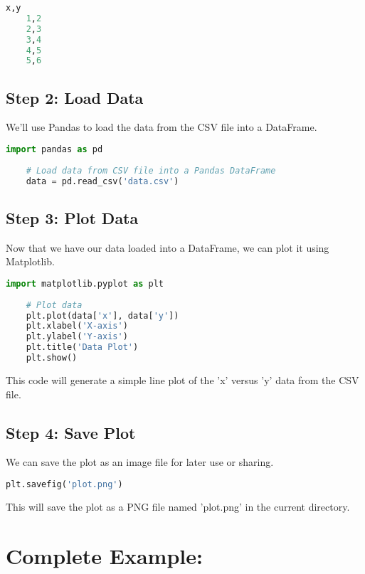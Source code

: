 \begin{lstlisting}[language=Python, caption=data.csv]
	x,y
	1,2
	2,3
	3,4
	4,5
	5,6
\end{lstlisting}

\subsection*{Step 2: Load Data}

We'll use Pandas to load the data from the CSV file into a DataFrame.

\begin{lstlisting}[language=Python, caption=Load Data]
	import pandas as pd
	
	# Load data from CSV file into a Pandas DataFrame
	data = pd.read_csv('data.csv')
\end{lstlisting}

\subsection*{Step 3: Plot Data}

Now that we have our data loaded into a DataFrame, we can plot it using Matplotlib.

\begin{lstlisting}[language=Python, caption=Plot Data]
	import matplotlib.pyplot as plt
	
	# Plot data
	plt.plot(data['x'], data['y'])
	plt.xlabel('X-axis')
	plt.ylabel('Y-axis')
	plt.title('Data Plot')
	plt.show()
\end{lstlisting}

This code will generate a simple line plot of the 'x' versus 'y' data from the CSV file.

\subsection*{Step 4: Save Plot}

We can save the plot as an image file for later use or sharing.

\begin{lstlisting}[language=Python, caption=Save Plot]
	plt.savefig('plot.png')
\end{lstlisting}

This will save the plot as a PNG file named 'plot.png' in the current directory.

\section*{Complete Example:}

